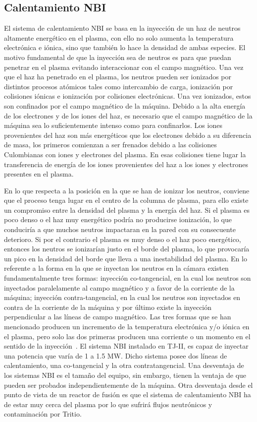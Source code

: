 \subsection*{Calentamiento NBI}
El sistema de calentamiento NBI se basa en la inyección de un haz de neutros altamente
energético en el plasma, con ello no solo aumenta la temperatura electrónica e iónica, sino que
también lo hace la densidad de ambas especies. El motivo fundamental de que la inyección
sea de neutros es para que puedan penetrar en el plasma evitando interaccionar con el campo
magnético.
Una vez que el haz ha penetrado en el plasma, los neutros pueden ser ionizados por distintos
procesos atómicos tales como intercambio de carga, ionización por colisiones iónicas e
ionización por colisiones electrónicas. Una vez ionizados, estos son confinados por el campo
magnético de la máquina. Debido a la alta energía de los electrones y de los iones del haz,
es necesario que el campo magnético de la máquina sea lo suficientemente intenso como para
confinarlos.
Los iones provenientes del haz son más energéticos que los electrones debido a su diferencia de
masa, los primeros comienzan a ser frenados debido a las colisiones Culombianas con iones
y electrones del plasma. En esas colisiones tiene lugar la transferencia de energía de los iones
provenientes del haz a los iones y electrones presentes en el plasma.\par
En lo que respecta a la posición en la que se han de ionizar los neutros, conviene que el
proceso tenga lugar en el centro de la columna de plasma, para ello existe un compromiso
entre la densidad del plasma y la energía del haz. Si el plasma es poco denso o el haz muy
energético podría no producirse ionización, lo que conduciría a que muchos neutros impactaran
en la pared con su consecuente deterioro. Si por el contrario el plasma es muy denso
o el haz poco energético, entonces los neutros se ionizarían justo en el borde del plasma, lo
que provocaría un pico en la densidad del borde que lleva a una inestabilidad del plasma.
En lo referente a la forma en la que se inyectan los neutros en la cámara existen fundamentalmente
tres formas: inyección co-tangencial, en la cual los neutros son inyectados paralelamente
al campo magnético y a favor de la corriente de la máquina; inyección contra-tangencial, en
la cual los neutros son inyectados en contra de la corriente de la máquina y por último existe
la inyección perpendicular a las líneas de campo magnético. Las tres formas que se han mencionado
producen un incremento de la temperatura electrónica y/o iónica en el plasma, pero
solo las dos primeras producen una corriente o un momento en el sentido de la inyección~\cite{wesson2004tokamaks}.
El sistema NBI instalado en TJ-II, es capaz de inyectar una potencia que varía de 1 a 1.5
MW. Dicho sistema posee dos líneas de calentamiento, una co-tangencial y la otra contratangencial.
Una desventaja de los sistemas NBI es el tamaño del equipo, sin embargo, tienen la ventaja
de que pueden ser probados independientemente de la máquina. Otra desventaja desde el
punto de vista de un reactor de fusión es que el sistema de calentamiento NBI ha de estar
muy cerca del plasma por lo que sufrirá flujos neutrónicos y contaminación por Tritio.